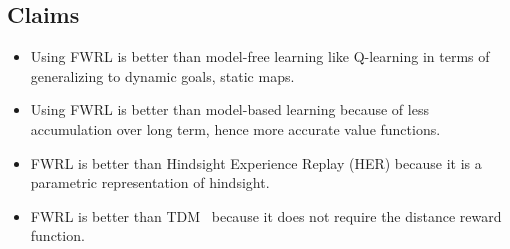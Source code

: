 \subsection{Claims}
\begin{itemize} \item
Using FWRL is better than model-free learning like Q-learning in terms of generalizing to dynamic goals, static maps.
\item 
Using FWRL is better than model-based learning because of less accumulation over long term, hence more accurate value functions.
\item FWRL is better than Hindsight Experience Replay (HER) \cite{andrychowicz2016learning} because it is a parametric representation of hindsight.
\item FWRL is better than TDM~\cite{pong2018temporal} because it does not require the distance reward function.
\end{itemize}
